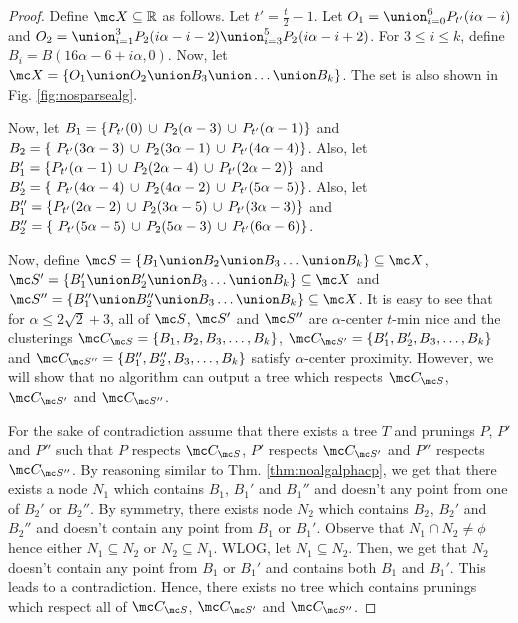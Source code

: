 \documentclass[11pt]{article}
\begin{document}
\begin{proof}
Define $\mc X \subseteq \mathbb{R}$ as follows. Let $t' = \frac{t}{2}-1$. Let $O_1 = \union_{i=0}^6 P_{t'}(i\alpha-i)$ and $O_2 = \union_{i=1}^3 P_2(i\alpha-i-2) \union_{i=3}^5 P_2(i\alpha-i+2)$. For $3\le i\le k$, define $B_i = B(16\alpha-6+i\alpha, 0)$. Now, let $\mc X = \{O_1 \union O_2 \union B_3 \union \ldots \union B_k\}$. The set is also shown in Fig. \ref{fig:nosparsealg}.

Now, let $B_1 = \{P_{t'}(0) \thinspace\cup\thinspace  P_{2}(\alpha-3) \thinspace\cup\thinspace P_{t'}(\alpha-1) \}$ and $B_2 = \{\ P_{t'}(3\alpha-3) \thinspace\cup\thinspace P_{2}(3\alpha-1)\thinspace\cup\thinspace P_{t'}(4\alpha-4)\}$. Also, let $B_1' = \{P_{t'}(\alpha-1) \thinspace\cup\thinspace  P_{2}(2\alpha-4) \thinspace\cup\thinspace P_{t'}(2\alpha-2) \}$ and $B_2' = \{\ P_{t'}(4\alpha-4) \thinspace\cup\thinspace P_{2}(4\alpha-2)\thinspace\cup\thinspace P_{t'}(5\alpha-5)\}$. Also, let $B_1'' = \{P_{t'}(2\alpha-2) \thinspace\cup\thinspace  P_{2}(3\alpha-5) \thinspace\cup\thinspace P_{t'}(3\alpha-3) \}$ and $B_2'' = \{\ P_{t'}(5\alpha-5) \thinspace\cup\thinspace P_{2}(5\alpha-3)\thinspace\cup\thinspace P_{t'}(6\alpha-6)\}$. 

Now, define $\mc S = \{B_1 \union B_2 \union B_3\ldots \union B_k\} \subseteq \mc X$, $\mc S' = \{B_1' \union B_2' \union B_3\ldots \union B_k\} \subseteq \mc X$ and $\mc S'' = \{B_1'' \union B_2'' \union B_3\ldots \union B_k\} \subseteq \mc X$. It is easy to see that for $\alpha \le 2\sqrt{2} + 3$, all of $\mc S$, $\mc S'$ and $\mc S''$ are $\alpha$-center $t$-min nice and the clusterings $\mc C_{\mc S} = \{B_1, B_2, B_3, \ldots, B_k\}$, $\mc C_{\mc S'} = \{B_1', B_2', B_3, \ldots, B_k\}$ and $\mc C_{\mc S''} = \{B_1'', B_2'', B_3, \ldots, B_k\}$ satisfy $\alpha$-center proximity. However, we will show that no algorithm can output a tree which respects $\mc C_{\mc S}$, $\mc C_{\mc S'}$ and $\mc C_{\mc S''}$.

For the sake of contradiction assume that there exists a tree $T$ and prunings $P$, $P'$ and $P''$ such that $P$ respects $\mc C_{\mc S}$, $P'$ respects $\mc C_{\mc S'}$ and $P''$ respects $\mc C_{\mc S''}$. By reasoning similar to Thm. \ref{thm:noalgalphacp}, we get that there exists a node $N_1$ which contains $B_1$, $B_1'$ and $B_1''$ and doesn't any point from one of $B_2'$ or $B_2''$. By symmetry, there exists node $N_2$ which contains $B_2$, $B_2'$ and $B_2''$ and doesn't contain any point from $B_1$ or $B_1'$. Observe that $N_1 \cap N_2 \neq \phi$ hence either $N_1 \subseteq N_2$ or $N_2 \subseteq N_1$. WLOG, let $N_1 \subseteq N_2$. Then, we get that $N_2$ doesn't contain any point from $B_1$ or $B_1'$ and contains both $B_1$ and $B_1'$. This leads to a contradiction. Hence, there exists no tree which contains prunings which respect all of $\mc C_{\mc S}$, $\mc C_{\mc S'}$ and $\mc C_{\mc S''}$.
\end{proof}
\end{document}
